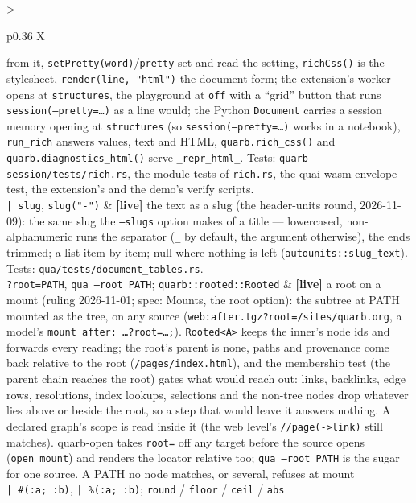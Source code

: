 \documentclass{report}
\newcommand{\live}{\textbf{\textcolor{blue!60!black}{[live]}}\xspace}
\begin{document}
\begin{xltabular}{\textwidth}{>{\raggedright\arraybackslash}p{0.36\textwidth} X}
    from it, \texttt{setPretty(word)}/\texttt{pretty} set and read the
    setting, \texttt{richCss()} is the stylesheet, \texttt{render(line,
    "html")} the document form; the extension's worker opens at
    \texttt{structures}, the playground at \texttt{off} with a ``grid''
    button that runs \texttt{session(--pretty=…)} as a line would; the
    Python \texttt{Document} carries a session memory opening at
    \texttt{structures} (so \texttt{session(--pretty=…)} works in a
    notebook), \texttt{run\_rich} answers values, text and HTML,
    \texttt{quarb.rich\_css()} and \texttt{quarb.diagnostics\_html()} serve
    \texttt{\_repr\_html\_}. Tests: \texttt{quarb-session/tests/rich.rs},
    the module tests of \texttt{rich.rs}, the quai-wasm envelope test,
    the extension's and the demo's verify scripts. \\
\texttt{| slug}, \texttt{slug("-")}
  & \live the text as a slug (the header-units round, 2026-11-09):
    the same slug the \texttt{--slugs} option makes of a title —
    lowercased, non-alphanumeric runs the separator (\texttt{\_} by
    default, the argument otherwise), the ends trimmed; a list item by
    item; null where nothing is left (\texttt{autounits::slug\_text}).
    Tests: \texttt{qua/tests/document\_tables.rs}. \\
\texttt{?root=PATH}, \texttt{qua --root PATH}; \texttt{quarb::rooted::Rooted}
  & \live a root on a mount (ruling 2026-11-01; spec: Mounts, the
    root option): the subtree at PATH mounted as the tree, on any
    source (\texttt{web:after.tgz?root=/sites/quarb.org}, a model's
    \texttt{mount after: …?root=…;}). \texttt{Rooted<A>} keeps the
    inner's node ids and forwards every reading; the root's parent is
    none, paths and provenance come back relative to the root
    (\texttt{/pages/index.html}), and the membership test (the parent
    chain reaches the root) gates what would reach out: links,
    backlinks, edge rows, resolutions, index lookups, selections and
    the non-tree nodes drop whatever lies above or beside the root, so
    a step that would leave it answers nothing. A declared graph's
    scope is read inside it (the web level's \texttt{//page(->link)}
    still matches). quarb-open takes \texttt{root=} off any target
    before the source opens (\texttt{open\_mount}) and renders the
    locator relative too; \texttt{qua --root PATH} is the sugar for
    one source. A PATH no node matches, or several, refuses at
    mount \\
\texttt{| \#(:a; :b)}, \texttt{| \%(:a; :b)}; \texttt{round} / \texttt{floor} / \texttt{ceil} / \texttt{abs}

\end{xltabular}
\end{document}
